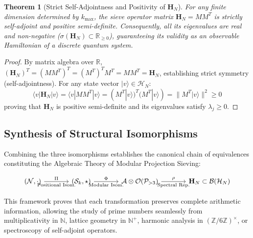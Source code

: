 \documentclass{article}
\numberwithin{equation}{section}
\theoremstyle{plain}
\newtheorem{theorem}{Theorem}[section]
\theoremstyle{definition}
\begin{document}
\begin{theorem}[Strict Self-Adjointness and Positivity of $\mathbf{H}_N$]
\label{thm:autoadjunto}
For any finite dimension determined by $k_{\max}$, the sieve operator matrix $\mathbf{H}_N = M M^T$ is strictly self-adjoint and positive semi-definite. Consequently, all its eigenvalues are real and non-negative ($\sigma(\mathbf{H}_N) \subset \mathbb{R}_{\ge 0}$), guaranteeing its validity as an observable Hamiltonian of a discrete quantum system.
\end{theorem}

\begin{proof}
By matrix algebra over $\mathbb{R}$, $(\mathbf{H}_N)^T = (M M^T)^T = (M^T)^T M^T = M M^T = \mathbf{H}_N$, establishing strict symmetry (self-adjointness). For any state vector $|v\rangle \in \mathcal{H}_N$:
\begin{equation}
\langle v | \mathbf{H}_N | v \rangle = \langle v | M M^T | v \rangle = (M^T |v\rangle)^T (M^T |v\rangle) = \|M^T |v\rangle\|^2 \ge 0
\end{equation}
proving that $\mathbf{H}_N$ is positive semi-definite and its eigenvalues satisfy $\lambda_j \ge 0$.
\end{proof}

\subsection{Synthesis of Structural Isomorphisms}

Combining the three isomorphisms establishes the canonical chain of equivalences constituting the Algebraic Theory of Modular Projection Sieving:

\begin{equation}
\begin{tikzcd}[column sep=large, row sep=large]
(\mathcal{N}, \cdot) \arrow[r, "\Pi", "\text{Positional Isom.}"'] 
& (\mathcal{S}_k, \star) \arrow[r, "\Phi", "\text{Modular Isom.}"'] 
& \mathcal{A} \otimes \mathcal{O}(\mathcal{P}_{>3}) \arrow[r, "\rho", "\text{Spectral Rep.}"'] 
& \mathbf{H}_N \subset \mathcal{B}(\mathcal{H}_N)
\end{tikzcd}
\end{equation}

This framework proves that each transformation preserves complete arithmetic information, allowing the study of prime numbers seamlessly from multiplicativity in $\mathbb{N}$, lattice geometry in $\mathbb{N}^+$, harmonic analysis in $(\mathbb{Z}/6\mathbb{Z})^\times$, or spectroscopy of self-adjoint operators.
\end{document}
